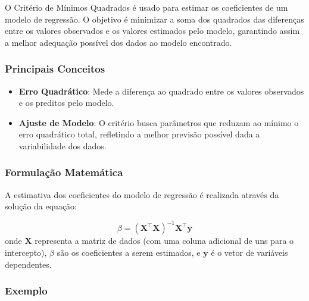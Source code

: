 \documentclass[
  a4paperpaper,
]{article}
\providecommand{\tightlist}{%
  \setlength{\itemsep}{0pt}\setlength{\parskip}{0pt}}\usepackage{longtable,booktabs,array}
\begin{document}
O Critério de Mínimos Quadrados é usado para estimar os coeficientes de
um modelo de regressão. O objetivo é minimizar a soma dos quadrados das
diferenças entre os valores observados e os valores estimados pelo
modelo, garantindo assim a melhor adequação possível dos dados ao modelo
encontrado.

\subsubsection{Principais Conceitos}\label{principais-conceitos-2}

\begin{itemize}
\tightlist
\item
  \textbf{Erro Quadrático}: Mede a diferença ao quadrado entre os
  valores observados e os preditos pelo modelo.
\item
  \textbf{Ajuste de Modelo}: O critério busca parâmetros que reduzam ao
  mínimo o erro quadrático total, refletindo a melhor previsão possível
  dada a variabilidade dos dados.
\end{itemize}

\subsubsection{Formulação
Matemática}\label{formulauxe7uxe3o-matemuxe1tica-2}

A estimativa dos coeficientes do modelo de regressão é realizada através
da solução da equação:

\[
\beta = (\mathbf{X}^\top\mathbf{X})^{-1} \mathbf{X}^\top\mathbf{y}
\] onde \(\mathbf{X}\) representa a matriz de dados (com uma coluna
adicional de uns para o intercepto), \(\beta\) são os coeficientes a
serem estimados, e \(\mathbf{y}\) é o vetor de variáveis dependentes.

\subsubsection{Exemplo}\label{exemplo-2}
\end{document}
